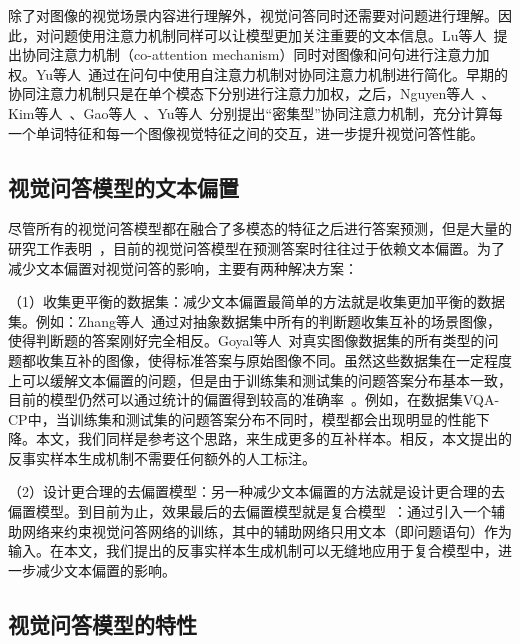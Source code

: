 除了对图像的视觉场景内容进行理解外，视觉问答同时还需要对问题进行理解。因此，对问题使用注意力机制同样可以让模型更加关注重要的文本信息。Lu等人~\cite{lu2017hierarchical}提出协同注意力机制（co-attention mechanism）同时对图像和问句进行注意力加权。Yu等人~\cite{yu2018beyond}通过在问句中使用自注意力机制对协同注意力机制进行简化。早期的协同注意力机制只是在单个模态下分别进行注意力加权，之后，Nguyen等人~\cite{nguyen2018improved}、Kim等人~\cite{kim2018bilinear}、Gao等人~\cite{gao2019dynamic}、Yu等人~\cite{yu2019deep}分别提出“密集型”协同注意力机制，充分计算每一个单词特征和每一个图像视觉特征之间的交互，进一步提升视觉问答性能。


\subsection{视觉问答模型的文本偏置}

尽管所有的视觉问答模型都在融合了多模态的特征之后进行答案预测，但是大量的研究工作表明~\cite{jabri2016revisiting,agrawal2016analyzing,zhang2016yin,goyal2017making}，目前的视觉问答模型在预测答案时往往过于依赖文本偏置。为了减少文本偏置对视觉问答的影响，主要有两种解决方案：

（1）收集更平衡的数据集：减少文本偏置最简单的方法就是收集更加平衡的数据集。例如：Zhang等人~\cite{zhang2016yin}通过对抽象数据集中所有的判断题收集互补的场景图像，使得判断题的答案刚好完全相反。Goyal等人~\cite{goyal2017making}对真实图像数据集的所有类型的问题都收集互补的图像，使得标准答案与原始图像不同。虽然这些数据集在一定程度上可以缓解文本偏置的问题，但是由于训练集和测试集的问题答案分布基本一致，目前的模型仍然可以通过统计的偏置得到较高的准确率~\cite{agrawal2018don}。例如，在数据集VQA-CP中，当训练集和测试集的问题答案分布不同时，模型都会出现明显的性能下降。本文，我们同样是参考这个思路，来生成更多的互补样本。相反，本文提出的反事实样本生成机制不需要任何额外的人工标注。

（2）设计更合理的去偏置模型：另一种减少文本偏置的方法就是设计更合理的去偏置模型。到目前为止，效果最后的去偏置模型就是复合模型~\cite{ramakrishnan2018overcoming,grand2019adversarial,belinkov2019don,cadene2019rubi,clark2019don,mahabadi2019simple}：通过引入一个辅助网络来约束视觉问答网络的训练，其中的辅助网络只用文本（即问题语句）作为输入。在本文，我们提出的反事实样本生成机制可以无缝地应用于复合模型中，进一步减少文本偏置的影响。


\subsection{视觉问答模型的特性}

